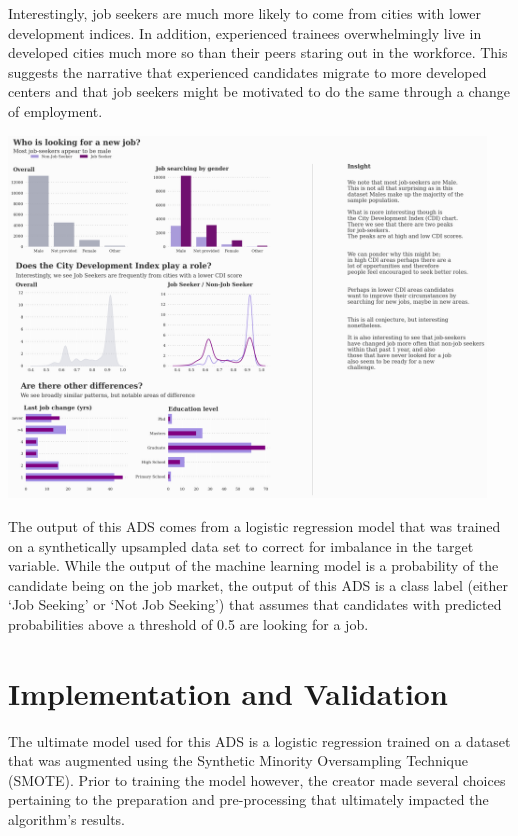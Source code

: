 Interestingly, job seekers are much more likely to come from cities with lower development indices.  In addition, experienced trainees overwhelmingly live in developed cities much more so than their peers staring out in the workforce.  This suggests the narrative that experienced candidates migrate to more developed centers and that job seekers might be motivated to do the same through a change of employment.


\begin{center}
\includegraphics[width=0.95\textwidth]{download-1}
\end{center}
 

The output of this ADS comes from a logistic regression model that was trained on a synthetically upsampled data set to correct for imbalance in the target variable.  While the output of the machine learning model is a probability of the candidate being on the job market, the output of this ADS is a class label (either `Job Seeking' or `Not Job Seeking') that assumes that candidates with predicted probabilities above a threshold of 0.5 are looking for a job.




\pagebreak

\section{Implementation and Validation}

The ultimate model used for this ADS is a logistic regression trained on a dataset that was augmented using the Synthetic Minority Oversampling Technique (SMOTE).  Prior to training the model however, the creator made several choices pertaining to the preparation and pre-processing that ultimately impacted the algorithm's results.

